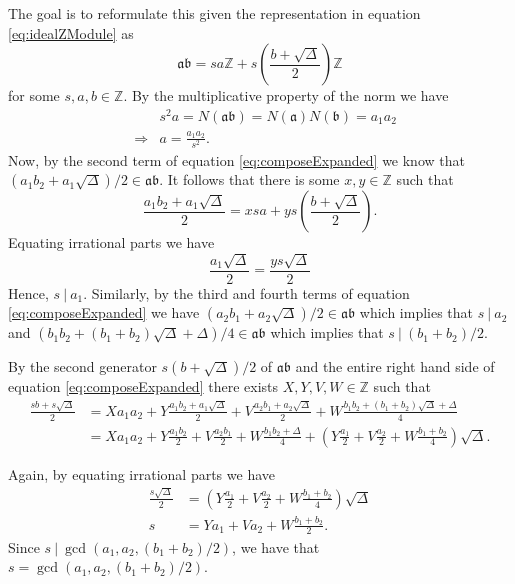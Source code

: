 \documentclass{ucalgthes1}
\theoremstyle{plain}
\theoremstyle{definition}
\newcommand{\ZZ}{\mathbb{Z}}
\begin{document}
\noindent
The goal is to reformulate this given the representation in equation \eqref{eq:idealZModule} as
\[
	\mathfrak{a} \mathfrak{b} = sa \ZZ + s \left(\frac{b + \sqrt{\Delta}}{2}\right) \ZZ
\]
for some $s, a, b \in \ZZ$.  By the multiplicative property of the norm we have
\begin{eqnarray*}
	&& s^2a = N(\mathfrak{a}\mathfrak{b}) = N(\mathfrak{a})N(\mathfrak{b}) = a_1 a_2 \\
	& \Rightarrow & a = \frac{a_1a_2}{s^2}.
\end{eqnarray*}
Now, by the second term of equation \eqref{eq:composeExpanded} we know that $(a_1b_2 + a_1\sqrt{\Delta})/2 \in \mathfrak{a}\mathfrak{b}$.  It follows that there is some $x,y \in \ZZ$ such that
\[
	\frac{a_1b_2 + a_1\sqrt{\Delta}}{2} = xsa + ys\left(\frac{b+\sqrt{\Delta}}{2}\right).
\]
Equating irrational parts we have
\begin{equation*}
	\frac{a_1\sqrt{\Delta}}{2} = \frac{ys\sqrt{\Delta}}{2}
\end{equation*}
\noindent
Hence, $s ~|~ a_1$.  Similarly, by the third and fourth terms of equation \eqref{eq:composeExpanded} we have $(a_2b_1+a_2\sqrt{\Delta})/2 \in \mathfrak{a}\mathfrak{b}$ which implies that $s~|~a_2$ and $(b_1b_2 + (b_1+b_2)\sqrt{\Delta} + \Delta)/4 \in \mathfrak{a}\mathfrak{b}$ which implies that $s~|~(b_1+b_2)/2$. 

By the second generator $s(b+\sqrt\Delta)/2$ of $\mathfrak{a}\mathfrak{b}$ and the entire right hand side of equation \eqref{eq:composeExpanded} there exists $X, Y, V, W \in \ZZ$ such that
\begin{equation}
\label{eq:composeSecond}
\begin{split}
	\frac{sb+s\sqrt\Delta}{2} & = Xa_1a_2 + Y\frac{a_1b_2+a_1\sqrt\Delta}{2} + V\frac{a_2b_1 + a_2\sqrt{\Delta}}{2} + W\frac{b_1b_2 + (b_1+b_2)\sqrt{\Delta} + \Delta}{4} \\
	& = Xa_1a_2 + Y\frac{a_1b_2}{2} + V\frac{a_2b_1}{2} + W\frac{b_1b_2 + \Delta}{4} + \left(Y\frac{a_1}{2} + V\frac{a_2}{2} + W\frac{b_1+b_2}{4}\right)\sqrt\Delta. 
\end{split}
\end{equation}

\noindent
Again, by equating irrational parts we have
\begin{align}
	\frac{s\sqrt\Delta}{2} & = \left(Y\frac{a_1}{2} + V\frac{a_2}{2} + W\frac{b_1+b_2}{4}\right)\sqrt\Delta \nonumber \\
	s & = Ya_1 + Va_2 + W\frac{b_1+b_2}{2}. \label{eq:sAsGCD}
\end{align}
Since $s~|~\gcd(a_1, a_2, (b_1+b_2)/2)$, we have that $s = \gcd(a_1, a_2, (b_1+b_2)/2)$.  
\end{document}
